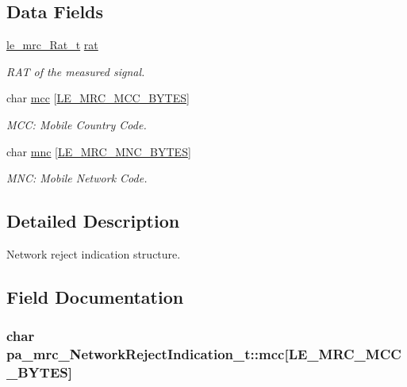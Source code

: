 \subsection*{Data Fields}
\begin{DoxyCompactItemize}
\item 
\hyperlink{le__mrc__interface_8h_aaf23906c37ad59fb96a8a48f7fab5b43}{le\+\_\+mrc\+\_\+\+Rat\+\_\+t} \hyperlink{structpa__mrc___network_reject_indication__t_ab1d5415b92d2a3cb7df31eaf5def6c14}{rat}
\begin{DoxyCompactList}\small\item\em R\+AT of the measured signal. \end{DoxyCompactList}\item 
char \hyperlink{structpa__mrc___network_reject_indication__t_a5aa5a700477db9f1fe347750ba818ef2}{mcc} \mbox{[}\hyperlink{le__mrc__interface_8h_aec88b97b54a45f86e6cb34f65b2d0afd}{L\+E\+\_\+\+M\+R\+C\+\_\+\+M\+C\+C\+\_\+\+B\+Y\+T\+ES}\mbox{]}
\begin{DoxyCompactList}\small\item\em M\+CC\+: Mobile Country Code. \end{DoxyCompactList}\item 
char \hyperlink{structpa__mrc___network_reject_indication__t_a2bd2cf6eadfd133be0eb01974c6b75aa}{mnc} \mbox{[}\hyperlink{le__mrc__interface_8h_aeae0e240c77730be724ad7ac42596469}{L\+E\+\_\+\+M\+R\+C\+\_\+\+M\+N\+C\+\_\+\+B\+Y\+T\+ES}\mbox{]}
\begin{DoxyCompactList}\small\item\em M\+NC\+: Mobile Network Code. \end{DoxyCompactList}\end{DoxyCompactItemize}


\subsection{Detailed Description}
Network reject indication structure. 

\subsection{Field Documentation}
\subsubsection[{\texorpdfstring{mcc}{mcc}}]{\setlength{\rightskip}{0pt plus 5cm}char pa\+\_\+mrc\+\_\+\+Network\+Reject\+Indication\+\_\+t\+::mcc\mbox{[}{\bf L\+E\+\_\+\+M\+R\+C\+\_\+\+M\+C\+C\+\_\+\+B\+Y\+T\+ES}\mbox{]}}\hypertarget{structpa__mrc___network_reject_indication__t_a5aa5a700477db9f1fe347750ba818ef2}{}\label{structpa__mrc___network_reject_indication__t_a5aa5a700477db9f1fe347750ba818ef2}


